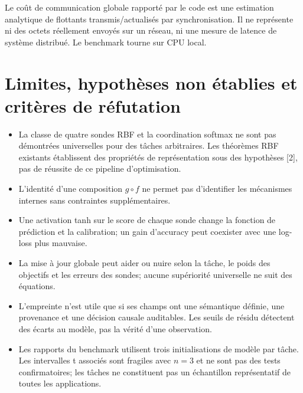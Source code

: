 \documentclass[11pt,a4paper]{article}
\begin{document}
Le coût de communication globale rapporté par le code est une estimation analytique de flottants transmis/actualisés par synchronisation. Il ne représente ni des octets réellement envoyés sur un réseau, ni une mesure de latence de système distribué. Le benchmark tourne sur CPU local.

\section{Limites, hypothèses non établies et critères de réfutation}
\begin{itemize}
\item La classe de quatre sondes RBF et la coordination softmax ne sont pas démontrées universelles pour des tâches arbitraires. Les théorèmes RBF existants établissent des propriétés de représentation sous des hypothèses [2], pas de réussite de ce pipeline d'optimisation.
\item L'identité d'une composition $g\circ f$ ne permet pas d'identifier les mécanismes internes sans contraintes supplémentaires.
\item Une activation tanh sur le score de chaque sonde change la fonction de prédiction et la calibration; un gain d'accuracy peut coexister avec une log-loss plus mauvaise.
\item La mise à jour globale peut aider ou nuire selon la tâche, le poids des objectifs et les erreurs des sondes; aucune supériorité universelle ne suit des équations.
\item L'empreinte n'est utile que si ses champs ont une sémantique définie, une provenance et une décision causale auditables. Les seuils de résidu détectent des écarts au modèle, pas la vérité d'une observation.
\item Les rapports du benchmark utilisent trois initialisations de modèle par tâche. Les intervalles t associés sont fragiles avec $n=3$ et ne sont pas des tests confirmatoires; les tâches ne constituent pas un échantillon représentatif de toutes les applications.
\end{itemize}
\end{document}
